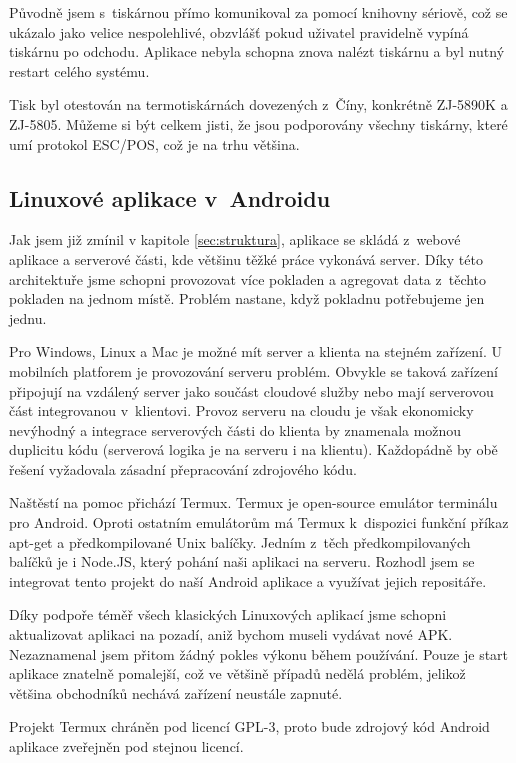 \documentclass[a4paper,11pt,oneside]{article}
\begin{document}
Původně jsem s~tiskárnou přímo komunikoval za pomocí knihovny sériově, což se ukázalo jako velice nespolehlivé, obzvlášť pokud uživatel pravidelně vypíná tiskárnu po odchodu. Aplikace nebyla schopna znova nalézt tiskárnu a byl nutný restart celého systému. 

Tisk byl otestován na termotiskárnách dovezených z~Číny, konkrétně ZJ-5890K a ZJ-5805. Můžeme si být celkem jisti, že jsou podporovány všechny tiskárny, které umí protokol ESC/POS, což je na trhu většina.

\subsection{Linuxové aplikace v~Androidu}

Jak jsem již zmínil v kapitole \ref{sec:struktura}, aplikace se skládá z~webové aplikace a serverové části, kde většinu těžké práce vykonává server. Díky této architektuře jsme schopni provozovat více pokladen a agregovat data z~těchto pokladen na jednom místě. Problém nastane, když pokladnu potřebujeme jen jednu. 

Pro Windows, Linux a Mac je možné mít server a klienta na stejném zařízení. U mobilních platforem je provozování serveru problém. Obvykle se taková zařízení připojují na vzdálený server jako součást cloudové služby nebo mají serverovou část integrovanou v~klientovi. Provoz serveru na cloudu je však ekonomicky nevýhodný a integrace serverových části do klienta by znamenala možnou duplicitu kódu (serverová logika je na serveru i na klientu). Každopádně by obě řešení vyžadovala zásadní přepracování zdrojového kódu.

Naštěstí na pomoc přichází Termux\cite{termux}. Termux je open-source emulátor terminálu pro Android. Oproti ostatním emulátorům má Termux k~dispozici funkční příkaz apt-get a předkompilované Unix balíčky. Jedním z~těch předkompilovaných balíčků je i Node.JS, který pohání naši aplikaci na serveru. Rozhodl jsem se integrovat tento projekt do naší Android aplikace a využívat jejich repositáře.

Díky podpoře téměř všech klasických Linuxových aplikací jsme schopni aktualizovat aplikaci na pozadí, aniž bychom museli vydávat nové APK. Nezaznamenal jsem přitom žádný pokles výkonu během používání. Pouze je start aplikace znatelně pomalejší, což ve většině případů nedělá problém, jelikož většina obchodníků nechává zařízení neustále zapnuté. 

\pagebreak

Projekt Termux chráněn pod licencí GPL-3, proto bude zdrojový kód Android aplikace zveřejněn pod stejnou licencí. 
\end{document}
